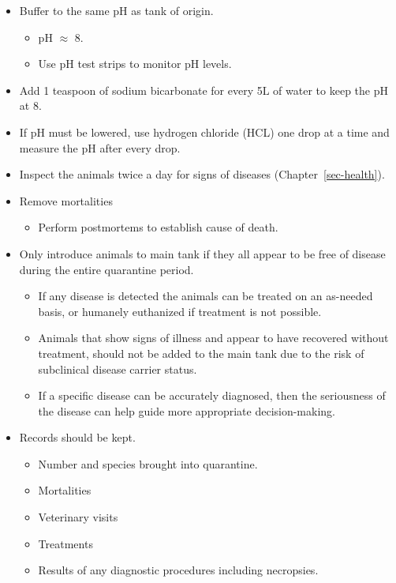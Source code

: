\documentclass[
  letterpaper,
  DIV=11,
  numbers=noendperiod]{scrreprt}
\providecommand{\tightlist}{%
  \setlength{\itemsep}{0pt}\setlength{\parskip}{0pt}}\usepackage{longtable,booktabs,array}
\begin{document}
\begin{itemize}
\tightlist
\item
  Buffer to the same pH as tank of origin.

  \begin{itemize}
  \tightlist
  \item
    pH \(\approx\) 8.
  \item
    Use pH test strips to monitor pH levels.
  \end{itemize}
\item
  Add 1 teaspoon of sodium bicarbonate for every 5\(\mathrm{L}\) of
  water to keep the pH at 8.
\item
  If pH must be lowered, use hydrogen chloride (HCL) one drop at a time
  and measure the pH after every drop.
\item
  Inspect the animals twice a day for signs of diseases
  (Chapter~\ref{sec-health}).
\item
  Remove mortalities

  \begin{itemize}
  \tightlist
  \item
    Perform postmortems to establish cause of death.
  \end{itemize}
\item
  Only introduce animals to main tank if they all appear to be free of
  disease during the entire quarantine period.

  \begin{itemize}
  \tightlist
  \item
    If any disease is detected the animals can be treated on an
    as-needed basis, or humanely euthanized if treatment is not
    possible.
  \item
    Animals that show signs of illness and appear to have recovered
    without treatment, should not be added to the main tank due to the
    risk of subclinical disease carrier status.
  \item
    If a specific disease can be accurately diagnosed, then the
    seriousness of the disease can help guide more appropriate
    decision-making.
  \end{itemize}
\item
  Records should be kept.

  \begin{itemize}
  \tightlist
  \item
    Number and species brought into quarantine.
  \item
    Mortalities
  \item
    Veterinary visits
  \item
    Treatments\\
  \item
    Results of any diagnostic procedures including necropsies.
  \end{itemize}
\end{itemize}
\end{document}
